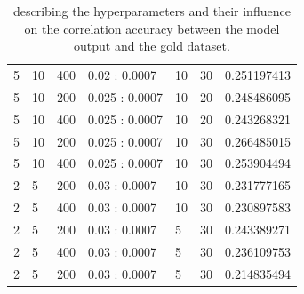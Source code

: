 \documentclass[paper=a4, fontsize=10pt, oneside]{scrartcl}
\begin{document}
\begin{table}
\begin{tabular}{ |p{1.4cm}|p{1cm}|p{2.4cm}|p{2.4cm}|p{1.3cm}|p{1cm}|p{2cm}|}
5 &10 &400 &0.02 : 0.0007 &10 &30 &0.251197413 \\
5 &10 &200 &0.025 : 0.0007 &10 &20 &0.248486095 \\
5 &10 &400 &0.025 : 0.0007 &10 &20 &0.243268321 \\
5 &10 &200 &0.025 : 0.0007 &10 &30 &0.266485015 \\
5 &10 &400 &0.025 : 0.0007 &10 &30 &0.253904494 \\
2 &5 &200 &0.03 : 0.0007 &10 &30 &0.231777165 \\
2 &5 &400 &0.03 : 0.0007 &10 &30 &0.230897583 \\
2 &5 &200 &0.03 : 0.0007 &5 &30 &0.243389271 \\
2 &5 &400 &0.03 : 0.0007 &5 &30 &0.236109753 \\
2 &5 &200 &0.03 : 0.0007 &5 &30 &0.214835494 \\
 \hline
\end{tabular}
\caption{\label{table}describing the hyperparameters and their influence on the correlation accuracy between the model output and the gold dataset.}
\end{table}
\end{document}
